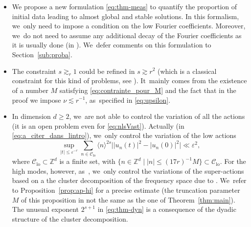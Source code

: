 \documentclass[JEP,XML,SOM,Unicode,published]{cedram}
\theoremstyle{plain}
\theoremstyle{definition}
\DeclareMathOperator{\lo}{lo}
\newcommand{\1}{\mathbf{1}}
\newcommand{\Clo}{\mathscr{C}_{\lo}}
\begin{document}
\label{sec:techni}
\begin{itemize}
\item We propose a new formulation \eqref{eq:thm-meas} to quantify the proportion of initial data leading to almost global and stable solutions. In this formalism, we~only need to impose a condition on the low Fourier coefficients. Moreover, we~do not need to assume any additional decay of the Fourier coefficients as it is usually done (\eg in \cite{Bou00,KillBill,KtA,LX23}). We~defer comments on this formulation to Section~\ref{sub:proba}.

\item The constraint $s\gtrsim_r 1$ could be refined in $s \gtrsim r^2$ (which is a classical constraint for this kind of problems, see \eg \cite{KtA}). It~mainly comes from the existence of a number $M$ satisfying \eqref{eq:contrainte_pour_M} and the fact that in the proof we impose $\nu \lesssim r^{-1}$, as~specified in \eqref{eq:upsilon}.
\item In dimension $d\geq 2$, we~are not able to control the variation of all the actions (it is an open problem even for \eqref{eq:nlsVast}). Actually (in \eqref{eq:a_citer_dans_lintro}), we~only control the variation of the low actions
\[
\sup_{|t|\leq \varepsilon^{-r}}\sum_{ n \in \Clo} \langle n \rangle^{2s} \big| |u_n(t)|^2 -|u_n(0)|^2 \big| \ll \varepsilon^2,
\]
where $\Clo \subset \mathbb{Z}^d$ is a finite set, with $\{ n\in \mathbb{Z}^d \mid |n| \leq (17r)^{-1} M \} \subset \Clo$. For the high modes, however, as~\cite{BFM22}, we~only control the variations of the super-actions based on a the cluster decomposition of the frequency space due to \cite{Bou98,Berti-Maspero-19}. We~refer to Proposition~\ref{prop:ap-hi} for a precise estimate (the truncation parameter $M$ of this proposition in not the same as the one of Theorem~\ref{thm:main}). The unusual exponent $2^{s+1}$ in \eqref{eq:thm-dyn} is a consequence of the dyadic structure of the cluster decomposition.
\end{itemize}
\end{document}
